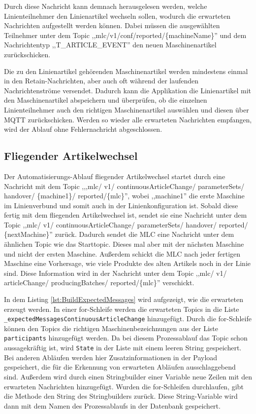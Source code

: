 Durch diese Nachricht kann demnach herausgelesen werden, welche Linienteilnehmer den Linienartikel wechseln sollen, wodurch die erwarteten Nachrichten aufgestellt werden können. Dabei müssen die ausgewählten Teilnehmer unter dem Topic ,,mlc/v1/conf/reported/\{machineName\}''  und dem Nachrichtentyp ,,T\_ARTICLE\_EVENT'' den neuen Maschinenartikel zurückschicken. 

Die zu den Linienartikel gehörenden Maschinenartikel werden mindestens einmal in den Retain-Nachrichten, aber auch oft während der laufenden Nachrichtenströme versendet. Dadurch kann die Applikation die Linienartikel mit den Maschinenartikel abspeichern und überprüfen, ob die einzelnen Linienteilnehmer auch den richtigen Maschinenartikel auswählen und diesen über MQTT zurückschicken. Werden so wieder alle erwarteten Nachrichten empfangen, wird der Ablauf ohne Fehlernachricht abgeschlossen.

\subsection{Fliegender Artikelwechsel}
Der Automatisierungs-Ablauf fliegender Artikelwechsel startet durch eine Nachricht mit dem Topic ,,,mlc/ v1/ continuousArticleChange/ parameterSets/ handover/ \{machine1\}/ reported/\{mlc\}'', wobei ,,machine1'' die erste Maschine im Linienverbund und somit auch in der Linienkonfiguration ist. Sobald diese fertig mit dem fliegenden Artikelwechsel ist, sendet sie eine Nachricht unter dem Topic ,,mlc/ v1/ continuousArticleChange/ parameterSets/ handover/ reported/ \{nextMachine\}'' zurück. Dadurch sendet die MLC eine Nachricht unter dem ähnlichen Topic wie das Starttopic. Dieses mal aber mit der nächsten Maschine und nicht der ersten Maschine. Außerdem schickt die MLC nach jeder fertigen Maschine eine Vorhersage, wie viele Produkte des alten Artikels noch in der Linie sind. Diese Information wird in der Nachricht unter dem Topic ,,mlc/ v1/ articleChange/ producingBatches/ reported/\{mlc\}'' verschickt. 

In dem Listing \ref{lst:BuildExpectedMessages} wird aufgezeigt, wie die erwarteten erzeugt werden. In einer for-Schleife werden die erwarteten Topics in die Liste \lstinline|_expectedMessagesContinuousArticleChange| hinzugefügt. Durch die for-Schleife können den Topics die richtigen Maschinenbezeichnungen aus der Liste \lstinline|participants| hinzugefügt werden. Da bei diesem Prozessablauf das Topic schon aussagekräftig ist, wird \lstinline|State| in der Liste mit einem leeren String gespeichert. Bei anderen Abläufen werden hier Zusatzinformationen in der Payload gespeichert, die für die Erkennung von erwarteten Abläufen ausschlaggebend sind. Außerdem wird durch einen Stringbuilder einer Variable neue Zeilen mit den erwarteten Nachrichten hinzugefügt. Wurden die for-Schleifen durchlaufen, gibt die Methode den String des Stringbuilders zurück. Diese String-Variable wird dann mit dem Namen des Prozessablaufs in der Datenbank gespeichert. 

